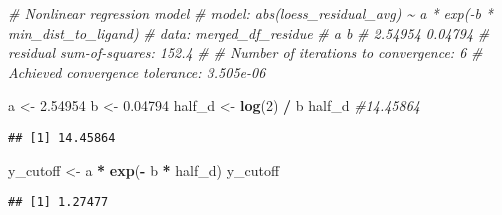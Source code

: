 \documentclass[
]{article}
\newenvironment{Shaded}{\begin{snugshade}}{\end{snugshade}}
\newcommand{\CommentTok}[1]{\textcolor[rgb]{0.56,0.35,0.01}{\textit{#1}}}
\newcommand{\DecValTok}[1]{\textcolor[rgb]{0.00,0.00,0.81}{#1}}
\newcommand{\FloatTok}[1]{\textcolor[rgb]{0.00,0.00,0.81}{#1}}
\newcommand{\FunctionTok}[1]{\textcolor[rgb]{0.13,0.29,0.53}{\textbf{#1}}}
\newcommand{\NormalTok}[1]{#1}
\newcommand{\OtherTok}[1]{\textcolor[rgb]{0.56,0.35,0.01}{#1}}
\newcommand{\SpecialCharTok}[1]{\textcolor[rgb]{0.81,0.36,0.00}{\textbf{#1}}}
\begin{document}
\begin{Shaded}
\begin{Highlighting}[]
\CommentTok{\# Nonlinear regression model}
\CommentTok{\#   model: abs(loess\_residual\_avg) \textasciitilde{} a * exp({-}b * min\_dist\_to\_ligand)}
\CommentTok{\#    data: merged\_df\_residue}
\CommentTok{\#       a       b }
\CommentTok{\# 2.54954 0.04794 }
\CommentTok{\#  residual sum{-}of{-}squares: 152.4}
\CommentTok{\# }
\CommentTok{\# Number of iterations to convergence: 6 }
\CommentTok{\# Achieved convergence tolerance: 3.505e{-}06}
\end{Highlighting}
\end{Shaded}

\begin{Shaded}
\begin{Highlighting}[]
\NormalTok{a }\OtherTok{\textless{}{-}} \FloatTok{2.54954}
\NormalTok{b }\OtherTok{\textless{}{-}} \FloatTok{0.04794} 
\NormalTok{half\_d }\OtherTok{\textless{}{-}} \FunctionTok{log}\NormalTok{(}\DecValTok{2}\NormalTok{) }\SpecialCharTok{/}\NormalTok{ b  }
\NormalTok{half\_d }\CommentTok{\#14.45864}
\end{Highlighting}
\end{Shaded}

\begin{verbatim}
## [1] 14.45864
\end{verbatim}

\begin{Shaded}
\begin{Highlighting}[]
\NormalTok{y\_cutoff }\OtherTok{\textless{}{-}}\NormalTok{ a  }\SpecialCharTok{*} \FunctionTok{exp}\NormalTok{(}\SpecialCharTok{{-}}\NormalTok{ b }\SpecialCharTok{*}\NormalTok{ half\_d)}
\NormalTok{y\_cutoff}
\end{Highlighting}
\end{Shaded}

\begin{verbatim}
## [1] 1.27477
\end{verbatim}
\end{document}
